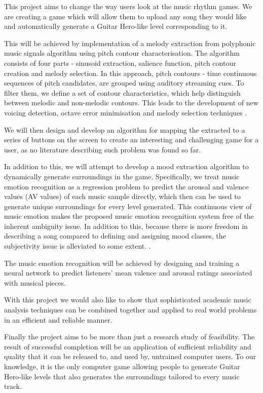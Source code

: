 This project aims to change the way users look at the music rhythm games. We are creating a game which will allow them to upload any song they would like and automatically generate a Guitar Hero-like level corresponding to it. 

This will be achieved by implementation of a melody extraction from polyphonic music signals algorithm using pitch contour characterisation. The algorithm consists of four parts - sinusoid extraction, salience function, pitch contour creation and melody selection. In this approach, pitch contours - time continuous sequences of pitch candidates, are grouped using auditory streaming cues. To filter them, we define a set of contour characteristics, which help distinguish between melodic and non-melodic contours. This leads to the development of new voicing detection, octave error minimisation and melody selection techniques \cite{salamon}.

We will then design and develop an algorithm for mapping the extracted to a series of buttons on the screen to create an interesting and challenging game for a user, as no literature describing such problem was found so far.

In addition to this, we will attempt to develop a mood extraction algorithm to dynamically generate surroundings in the game. Specifically, we treat music emotion recognition as a regression problem to predict the arousal and valence values (AV values) of each music sample directly, which then can be used to generate unique surroundings for every level generated. This continuous view of music emotion makes the proposed music emotion recognition system free of the inherent ambiguity issue. In addition to this, because there is more freedom in describing a song compared to defining and assigning mood classes, the subjectivity issue is alleviated to some extent. \cite{mood}.

The music emotion recognition will be achieved by designing and training a neural network to predict listeners’ mean valence and arousal ratings associated with musical pieces.

With this project we would also like to show that sophisticated academic music analysis techniques can be combined together and applied to real world problems in an efficient and reliable manner. 

Finally the project aims to be more than just a research study of feasibility. The result of successful completion will be an application of sufficient reliability and quality that it can be released to, and used by, untrained computer users. To our knowledge, it is the only computer game allowing people to generate Guitar Hero-like levels that also generates the surroundings tailored to every music track.

